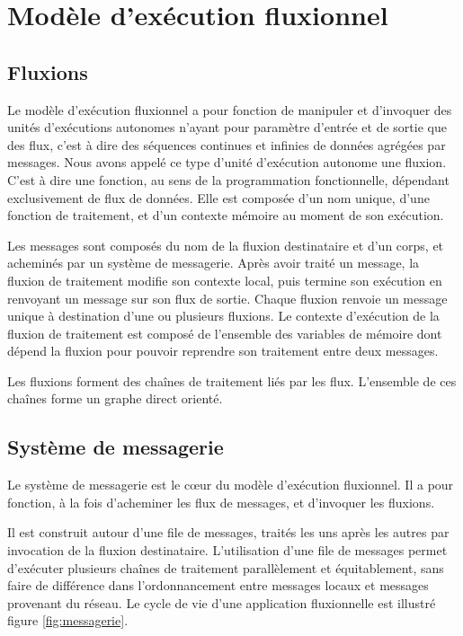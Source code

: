 \section{Modèle d'exécution fluxionnel}

\subsection{Fluxions}

Le modèle d'exécution fluxionnel a pour fonction de manipuler et d'invoquer des unités d'exécutions autonomes n'ayant pour paramètre d'entrée et de sortie que des flux, c'est à dire des séquences continues et infinies de données agrégées par messages.
Nous avons appelé ce type d'unité d'exécution autonome une fluxion.
C'est à dire une fonction, au sens de la programmation fonctionnelle, dépendant exclusivement de flux de données.
Elle est composée d'un nom unique, d'une fonction de traitement, et d'un contexte mémoire au moment de son exécution.

Les messages sont composés du nom de la fluxion destinataire et d'un corps, et acheminés par un système de messagerie.
Après avoir traité un message, la fluxion de traitement modifie son contexte local, puis termine son exécution en renvoyant un message sur son flux de sortie.
Chaque fluxion renvoie un message unique à destination d'une ou plusieurs fluxions.
Le contexte d'exécution de la fluxion de traitement est composé de l'ensemble des variables de mémoire dont dépend la fluxion pour pouvoir reprendre son traitement entre deux messages.

Les fluxions forment des chaînes de traitement liés par les flux.
L'ensemble de ces chaînes forme un graphe direct orienté.

\subsection{Système de messagerie}

Le système de messagerie est le cœur du modèle d'exécution fluxionnel.
Il a pour fonction, à la fois d'acheminer les flux de messages, et d'invoquer les fluxions.

Il est construit autour d'une file de messages, traités les uns après les autres par invocation de la fluxion destinataire.
L'utilisation d'une file de messages permet d'exécuter plusieurs chaînes de traitement parallèlement et équitablement, sans faire de différence dans l'ordonnancement entre messages locaux et messages provenant du réseau.
Le cycle de vie d'une application fluxionnelle est illustré figure \ref{fig:messagerie}.

